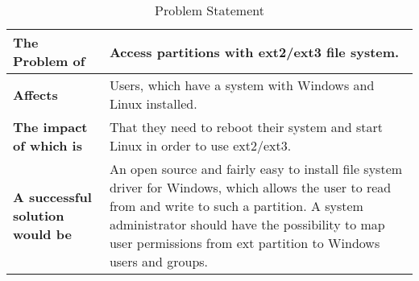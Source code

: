 \begin{longtable}{|p{4.4cm}|X|}
	\caption[]{\label{tab:visionProblemStmt} Problem Statement}\\
	\hline
	  \textbf{The Problem of} & 
	  Access partitions with ext2/ext3 file system. \\
	\hline
    \textbf{Affects} &
    Users, which have a system with Windows and Linux installed. \\
	\hline
	  \textbf{The impact of which is} &
	  That they need to reboot their system and start Linux in order to use ext2/ext3. \\
	\hline
    \textbf{A successful solution would be} &
    An open source and fairly easy to install file system driver for Windows, which allows the user to read from and write to such a partition. A system administrator should have the possibility to map user permissions from ext partition to Windows users and groups. \\
	\hline
\end{longtable}
